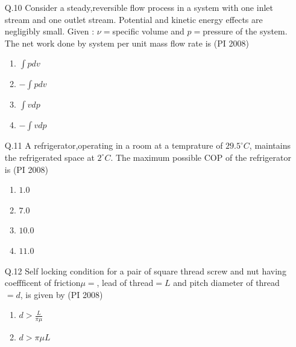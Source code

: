 \documentclass[journal,12pt,onecolumn]{IEEEtran}
\theoremstyle{remark}
\begin{document}
\begin{enumerate}
\begin{multicols}{4}
\begin{enumerate}[label=(\Alph*)]
        \item $1-\alpha$
        \item $1-\frac{\alpha}{2}$
        \item $2\alpha$
    \end{enumerate}
\end{multicols}
\vspace{1cm}
\item[\textnormal{Q.10}] Consider a steady,reversible flow process in a system with one inlet stream and one outlet stream. Potential and kinetic energy effects are negligibly small. Given : $\nu=$specific volume and $p=$pressure of the system. The net work done by system per unit mass flow rate is 
    \hfill{(PI 2008)}
    \begin{multicols}{4}
    \begin{enumerate}[label=(\Alph*)]
        \item $\int pdv$
        \item $-\int pdv$
        \item $\int vdp$
        \item $-\int vdp$
    \end{enumerate}
\end{multicols}
\vspace{1cm}
\item[\textnormal{Q.11}]  A refrigerator,operating in a room at a temprature of $29.5^{\circ}C$, maintains the refrigerated space at $2^{\circ}C$. The maximum possible COP of the refrigerator is 
    \hfill{(PI 2008)}
    \begin{multicols}{4}
    \begin{enumerate}[label=(\Alph*)]
        \item $1.0$
        \item $7.0$
        \item $10.0$
        \item $11.0$
    \end{enumerate}
\end{multicols}
\vspace{1cm}
\item[\textnormal{Q.12}]  Self locking condition for a pair of square thread screw and nut having coeffficent of friction$\mu=$, lead of thread$=L$ and pitch diameter of thread $=d$, is given by
    \hfill{(PI 2008)}
    \begin{multicols}{4}
    \begin{enumerate}[label=(\Alph*)]
        \item $d>\frac{L}{\pi\mu}$
        \item $d>\pi\mu L$

\end{enumerate}
\end{multicols}
\end{enumerate}
\end{document}
